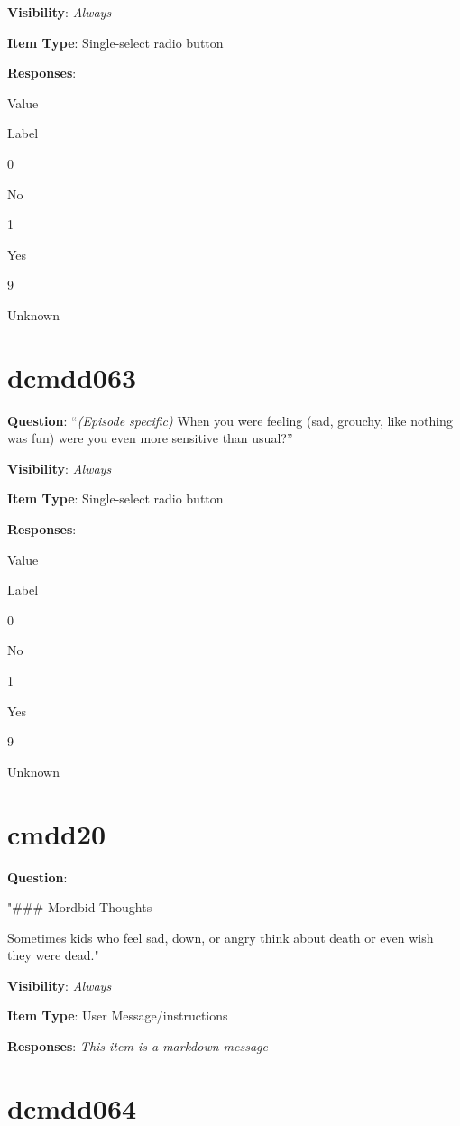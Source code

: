 \documentclass[
]{book}
\begin{document}
\textbf{Visibility}: \emph{Always}

\textbf{Item Type}: Single-select radio button

\textbf{Responses}:

Value

Label

0

No

1

Yes

9

Unknown

\hypertarget{dcmdd063}{%
\section{dcmdd063}\label{dcmdd063}}

\textbf{Question}: ``\emph{(Episode specific)} When you were feeling (sad, grouchy, like nothing was fun) were you even more sensitive than usual?''

\textbf{Visibility}: \emph{Always}

\textbf{Item Type}: Single-select radio button

\textbf{Responses}:

Value

Label

0

No

1

Yes

9

Unknown

\hypertarget{cmdd20}{%
\section{cmdd20}\label{cmdd20}}

\textbf{Question}:

"\#\#\# Mordbid Thoughts

Sometimes kids who feel sad, down, or angry think about death or even wish they were dead."

\textbf{Visibility}: \emph{Always}

\textbf{Item Type}: User Message/instructions

\textbf{Responses}: \emph{This item is a markdown message}

\hypertarget{dcmdd064}{%
\section{dcmdd064}\label{dcmdd064}}
\end{document}
